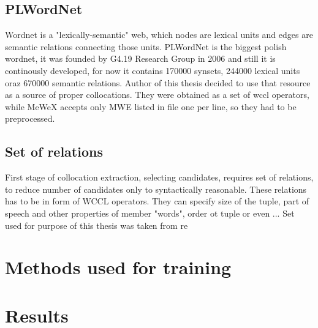 \subsection{PLWordNet}
Wordnet is a "lexically-semantic" web, which nodes are lexical units and edges are semantic relations connecting those units.
PLWordNet is the biggest polish wordnet, it was founded by G4.19 Research Group in 2006 and still it is continously developed, 
for now it contains 170000 synsets, 244000 lexical units oraz 670000 semantic relations. Author of this thesis decided to use that resource 
as a source of proper collocations. They were obtained as a set of wccl operators, while MeWeX accepts only MWE listed in file one per line, 
so they had to be preprocessed.

\subsection{Set of relations}
First stage of collocation extraction, selecting candidates, requires set of relations, to reduce number of candidates only to syntactically reasonable. 
These relations has to be in form of WCCL operators. They can specify size of the tuple, part of speech and other properties of member "words", 
order ot tuple or even ... Set used for purpose of this thesis was taken from re

\section{Methods used for training}

\section{Results}
